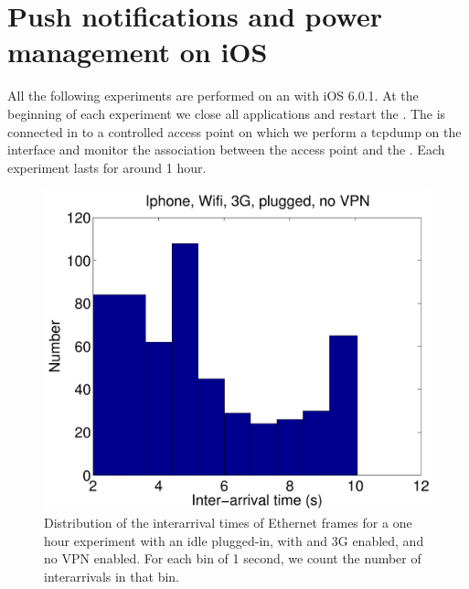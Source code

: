 \section{Push notifications and power management on iOS}
\label{sec:pushnotification}

All the following experiments are performed on an  with iOS
6.0.1.  At the beginning of each experiment we close all applications
and restart the \iphone{}. The \iphone{} is connected in \wifi{} to a
controlled access point on which we perform a tcpdump on the \wifi{}
interface and monitor the \wifi{} association between the access point
and the \iphone{}. Each experiment lasts for around 1 hour. 

\begin{figure}
\centering
        \includegraphics[width=0.8\linewidth]{../../code/pushNotification/Fig/bw_iphone_wifi_3g_plug_novpn_interTs.pdf}
  \caption{Distribution of the interarrival times of Ethernet frames
    for a one hour experiment with an idle \iphone{} plugged-in, with \wifi{} and 3G
    enabled, and no VPN enabled. For each bin of 1 second, we count
    the number of interarrivals in that bin.}
  \label{fig:push_w3p_interTs}
\end{figure}

